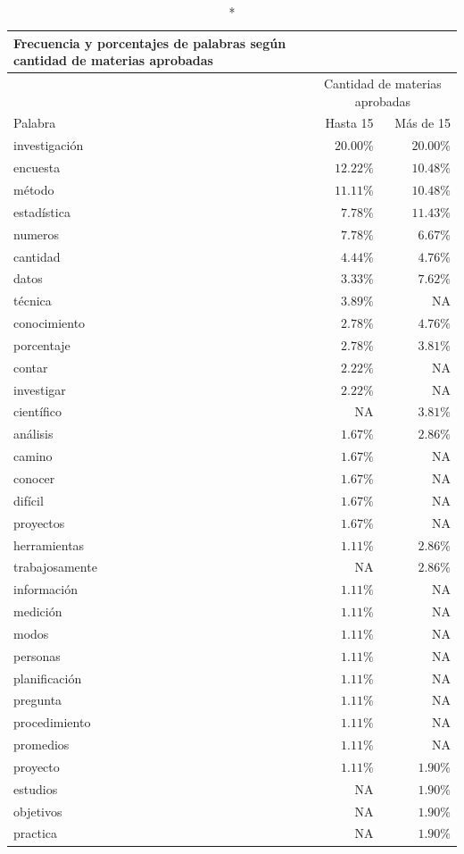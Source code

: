 \documentclass[
  letterpaper,
  DIV=11,
  numbers=noendperiod]{scrreprt}
\begin{document}
\begin{longtable}{lrr}
\caption*{
{\large Frecuencia y porcentajes de palabras según cantidad de materias aprobadas}
} \\ 
\toprule
 & \multicolumn{2}{c}{Cantidad de materias aprobadas} \\ 
\cmidrule(lr){2-3}
Palabra & Hasta 15 & Más de 15 \\ 
\midrule
investigación & $20.00\%$ & $20.00\%$ \\ 
encuesta & $12.22\%$ & $10.48\%$ \\ 
método & $11.11\%$ & $10.48\%$ \\ 
estadística & $7.78\%$ & $11.43\%$ \\ 
numeros & $7.78\%$ & $6.67\%$ \\ 
cantidad & $4.44\%$ & $4.76\%$ \\ 
datos & $3.33\%$ & $7.62\%$ \\ 
técnica & $3.89\%$ & NA \\ 
conocimiento & $2.78\%$ & $4.76\%$ \\ 
porcentaje & $2.78\%$ & $3.81\%$ \\ 
contar & $2.22\%$ & NA \\ 
investigar & $2.22\%$ & NA \\ 
científico & NA & $3.81\%$ \\ 
análisis & $1.67\%$ & $2.86\%$ \\ 
camino & $1.67\%$ & NA \\ 
conocer & $1.67\%$ & NA \\ 
difícil & $1.67\%$ & NA \\ 
proyectos & $1.67\%$ & NA \\ 
herramientas & $1.11\%$ & $2.86\%$ \\ 
trabajosamente & NA & $2.86\%$ \\ 
información & $1.11\%$ & NA \\ 
medición & $1.11\%$ & NA \\ 
modos & $1.11\%$ & NA \\ 
personas & $1.11\%$ & NA \\ 
planificación & $1.11\%$ & NA \\ 
pregunta & $1.11\%$ & NA \\ 
procedimiento & $1.11\%$ & NA \\ 
promedios & $1.11\%$ & NA \\ 
proyecto & $1.11\%$ & $1.90\%$ \\ 
estudios & NA & $1.90\%$ \\ 
objetivos & NA & $1.90\%$ \\ 
practica & NA & $1.90\%$ \\ 
\bottomrule
\end{longtable}
\end{document}
